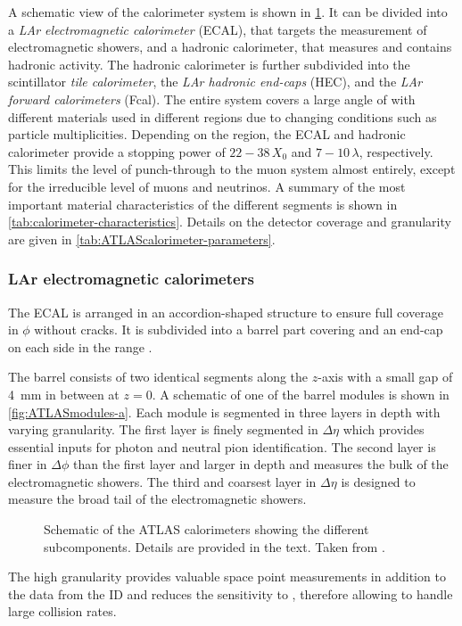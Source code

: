 A schematic view of the calorimeter system is shown in \cref{fig:ATLAScalorimeters}.
It can be divided into a \emph{LAr electromagnetic calorimeter} (ECAL), that targets the measurement of electromagnetic showers, and a hadronic calorimeter, that measures and contains hadronic activity. The hadronic calorimeter is further subdivided into the scintillator \emph{tile calorimeter}, the \emph{LAr hadronic end-caps} (HEC), and the \emph{LAr forward calorimeters} (Fcal).
The entire system covers a large angle of  with different materials used in different \abseta regions due to changing conditions such as particle multiplicities.
Depending on the \abseta region, the ECAL and hadronic calorimeter provide a stopping power of $22-38\,X_0$ and $7-10\,\lambda$, respectively.
This limits the level of punch-through to the muon system almost entirely, except for the irreducible level of muons and neutrinos. %
A summary of the most important material characteristics of the different segments is shown in \cref{tab:calorimeter-characteristics}.
Details on the detector coverage and granularity are given in \cref{tab:ATLAScalorimeter-parameters}.

\subsubsection{LAr electromagnetic calorimeters}
The ECAL is arranged in an accordion-shaped structure to ensure full coverage in $\phi$ without cracks.
It is subdivided into a barrel part covering  and an end-cap on each side in the range .

The barrel consists of two identical segments along the $z$-axis with a small gap of \SI{4}{\milli\meter} in between at $z=0$. A schematic of one of the barrel modules is shown in \cref{fig:ATLASmodules-a}. Each module is segmented in three layers in depth with varying granularity.
The first layer is finely segmented in $\Delta \eta$ which provides essential inputs for photon and neutral pion identification. The second layer is finer in $\Delta \phi$ than the first layer and larger in depth and measures the bulk of the electromagnetic showers. The third and coarsest layer in $\Delta \eta$ is designed to measure the broad tail of the electromagnetic showers.
\begin{figure}[h]
    \caption[Schematic of the ATLAS calorimeters showing the different subcomponents.]{Schematic of the ATLAS calorimeters showing the different subcomponents. Details are provided in the text. Taken from .}
    \label{fig:ATLAScalorimeters}
\end{figure}

The high granularity provides valuable space point measurements in addition to the data from the ID and reduces the sensitivity to \pileup, therefore allowing to handle large collision rates.


